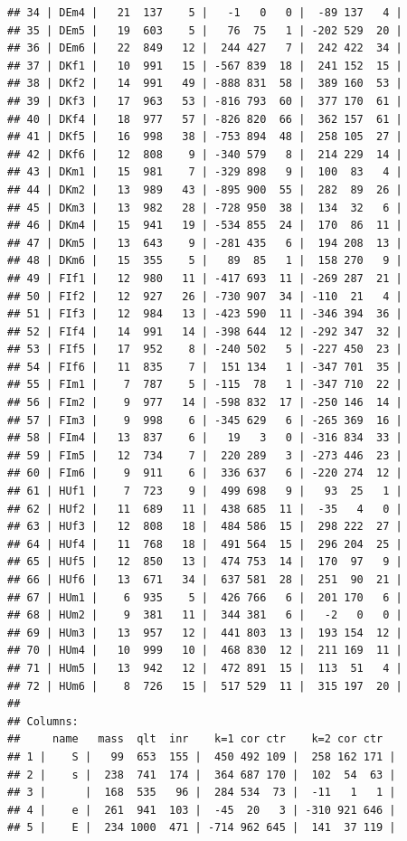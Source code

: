 \documentclass[
  finnish,
]{book}
\begin{document}
\begin{verbatim}
## 34 | DEm4 |   21  137    5 |   -1   0   0 |  -89 137   4 |
## 35 | DEm5 |   19  603    5 |   76  75   1 | -202 529  20 |
## 36 | DEm6 |   22  849   12 |  244 427   7 |  242 422  34 |
## 37 | DKf1 |   10  991   15 | -567 839  18 |  241 152  15 |
## 38 | DKf2 |   14  991   49 | -888 831  58 |  389 160  53 |
## 39 | DKf3 |   17  963   53 | -816 793  60 |  377 170  61 |
## 40 | DKf4 |   18  977   57 | -826 820  66 |  362 157  61 |
## 41 | DKf5 |   16  998   38 | -753 894  48 |  258 105  27 |
## 42 | DKf6 |   12  808    9 | -340 579   8 |  214 229  14 |
## 43 | DKm1 |   15  981    7 | -329 898   9 |  100  83   4 |
## 44 | DKm2 |   13  989   43 | -895 900  55 |  282  89  26 |
## 45 | DKm3 |   13  982   28 | -728 950  38 |  134  32   6 |
## 46 | DKm4 |   15  941   19 | -534 855  24 |  170  86  11 |
## 47 | DKm5 |   13  643    9 | -281 435   6 |  194 208  13 |
## 48 | DKm6 |   15  355    5 |   89  85   1 |  158 270   9 |
## 49 | FIf1 |   12  980   11 | -417 693  11 | -269 287  21 |
## 50 | FIf2 |   12  927   26 | -730 907  34 | -110  21   4 |
## 51 | FIf3 |   12  984   13 | -423 590  11 | -346 394  36 |
## 52 | FIf4 |   14  991   14 | -398 644  12 | -292 347  32 |
## 53 | FIf5 |   17  952    8 | -240 502   5 | -227 450  23 |
## 54 | FIf6 |   11  835    7 |  151 134   1 | -347 701  35 |
## 55 | FIm1 |    7  787    5 | -115  78   1 | -347 710  22 |
## 56 | FIm2 |    9  977   14 | -598 832  17 | -250 146  14 |
## 57 | FIm3 |    9  998    6 | -345 629   6 | -265 369  16 |
## 58 | FIm4 |   13  837    6 |   19   3   0 | -316 834  33 |
## 59 | FIm5 |   12  734    7 |  220 289   3 | -273 446  23 |
## 60 | FIm6 |    9  911    6 |  336 637   6 | -220 274  12 |
## 61 | HUf1 |    7  723    9 |  499 698   9 |   93  25   1 |
## 62 | HUf2 |   11  689   11 |  438 685  11 |  -35   4   0 |
## 63 | HUf3 |   12  808   18 |  484 586  15 |  298 222  27 |
## 64 | HUf4 |   11  768   18 |  491 564  15 |  296 204  25 |
## 65 | HUf5 |   12  850   13 |  474 753  14 |  170  97   9 |
## 66 | HUf6 |   13  671   34 |  637 581  28 |  251  90  21 |
## 67 | HUm1 |    6  935    5 |  426 766   6 |  201 170   6 |
## 68 | HUm2 |    9  381   11 |  344 381   6 |   -2   0   0 |
## 69 | HUm3 |   13  957   12 |  441 803  13 |  193 154  12 |
## 70 | HUm4 |   10  999   10 |  468 830  12 |  211 169  11 |
## 71 | HUm5 |   13  942   12 |  472 891  15 |  113  51   4 |
## 72 | HUm6 |    8  726   15 |  517 529  11 |  315 197  20 |
## 
## Columns:
##     name   mass  qlt  inr    k=1 cor ctr    k=2 cor ctr  
## 1 |    S |   99  653  155 |  450 492 109 |  258 162 171 |
## 2 |    s |  238  741  174 |  364 687 170 |  102  54  63 |
## 3 |      |  168  535   96 |  284 534  73 |  -11   1   1 |
## 4 |    e |  261  941  103 |  -45  20   3 | -310 921 646 |
## 5 |    E |  234 1000  471 | -714 962 645 |  141  37 119 |
\end{verbatim}
\end{document}
